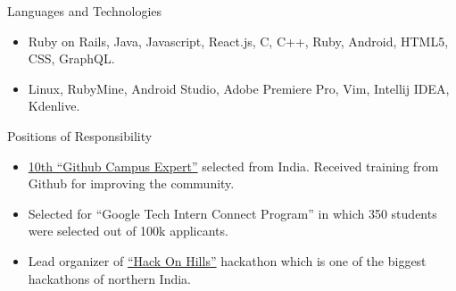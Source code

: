 \documentclass[]{mcdowellcv}
\begin{document}
	\begin{cvsection}{Languages and Technologies}
		\begin{cvsubsection}{}{}{}	
			\begin{itemize}
				\item Ruby on Rails, Java, Javascript, React.js, C, C++, Ruby, Android, HTML5, CSS, GraphQL.
				\item Linux, RubyMine, Android Studio, Adobe Premiere Pro, Vim, Intellij IDEA, Kdenlive.
			\end{itemize}
		\end{cvsubsection}
	\end{cvsection}
	
	\begin{cvsection}{Positions of Responsibility}
		\begin{cvsubsection}{}{}{}	
			\begin{itemize}
				\item {\href {https://githubcampus.expert/sukhbir-singh/}{10th ``Github Campus Expert''}} selected from India. Received training from Github for improving the community.
				\item Selected for ``Google Tech Intern Connect Program'' in which 350 students were selected out of 100k applicants.
				\item Lead organizer of {\href {http://hackonhills.com/}{``Hack On Hills''}} hackathon which is one of the biggest hackathons of northern India.
			\end{itemize}
		\end{cvsubsection}
	\end{cvsection}
	
\end{document}
